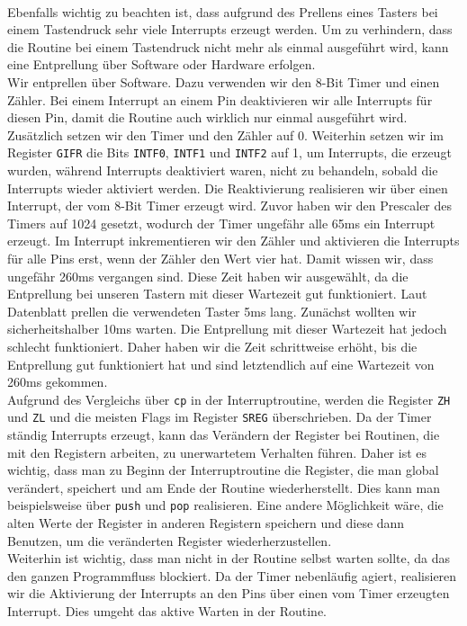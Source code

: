 \documentclass[]{article}
\begin{document}
\\Ebenfalls wichtig zu beachten ist, dass aufgrund des Prellens eines Tasters bei einem Tastendruck sehr viele Interrupts erzeugt werden. Um zu verhindern, dass die Routine bei einem Tastendruck nicht mehr als einmal ausgeführt wird, kann eine Entprellung über Software oder Hardware erfolgen. 
\\Wir entprellen über Software. Dazu verwenden wir den 8-Bit Timer und einen Zähler. Bei einem Interrupt an einem Pin deaktivieren wir alle Interrupts für diesen Pin, damit die Routine auch wirklich nur einmal ausgeführt wird. Zusätzlich setzen wir den Timer und den Zähler auf 0. Weiterhin setzen wir im Register \texttt{GIFR} die Bits \texttt{INTF0}, \texttt{INTF1} und \texttt{INTF2} auf 1, um Interrupts, die erzeugt wurden, während Interrupts deaktiviert waren, nicht zu behandeln, sobald die Interrupts wieder aktiviert werden. Die Reaktivierung realisieren wir über einen Interrupt, der vom 8-Bit Timer erzeugt wird. Zuvor haben wir den Prescaler des Timers auf 1024 gesetzt, wodurch der Timer ungefähr alle 65ms ein Interrupt erzeugt. Im Interrupt inkrementieren wir den Zähler und aktivieren die Interrupts für alle Pins erst, wenn der Zähler den Wert vier hat. Damit wissen wir, dass ungefähr 260ms vergangen sind. Diese Zeit haben wir ausgewählt, da die Entprellung bei unseren Tastern mit dieser Wartezeit gut funktioniert. Laut Datenblatt prellen die verwendeten Taster 5ms lang. Zunächst wollten wir sicherheitshalber 10ms warten. Die Entprellung mit dieser Wartezeit hat jedoch schlecht funktioniert. Daher haben wir die Zeit schrittweise erhöht, bis die Entprellung gut funktioniert hat und sind letztendlich auf eine Wartezeit von 260ms gekommen. 
\\Aufgrund des Vergleichs über \texttt{cp} in der Interruptroutine, werden die Register \texttt{ZH} und \texttt{ZL} und die meisten Flags im Register \texttt{SREG} überschrieben. Da der Timer ständig Interrupts erzeugt, kann das Verändern der Register bei Routinen, die mit den Registern arbeiten, zu unerwartetem Verhalten führen. Daher ist es wichtig, dass man zu Beginn der Interruptroutine die Register, die man global verändert, speichert und am Ende der Routine wiederherstellt. Dies kann man beispielsweise über \texttt{push} und \texttt{pop} realisieren. Eine andere Möglichkeit wäre, die alten Werte der Register in anderen Registern speichern und diese dann Benutzen, um die veränderten Register wiederherzustellen. 
\\Weiterhin ist wichtig, dass man nicht in der Routine selbst warten sollte, da das den ganzen Programmfluss blockiert. Da der Timer nebenläufig agiert, realisieren wir die Aktivierung der Interrupts an den Pins über einen vom Timer erzeugten Interrupt. Dies umgeht das aktive Warten in der Routine.
\end{document}
